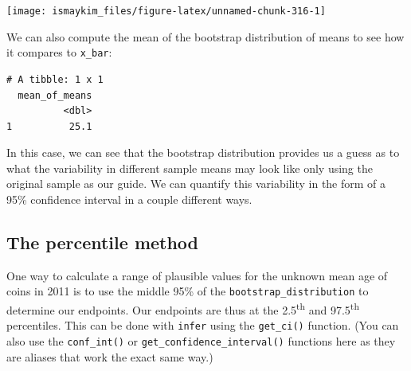 \documentclass[12pt,]{krantz}
\makeatletter
\newenvironment{Shaded}{\begin{snugshade}}{\end{snugshade}}
\newcommand{\KeywordTok}[1]{\textcolor[rgb]{0.27,0.27,0.27}{\textbf{#1}}}
\newcommand{\DataTypeTok}[1]{\textcolor[rgb]{0.27,0.27,0.27}{#1}}
\newcommand{\FloatTok}[1]{\textcolor[rgb]{0.06,0.06,0.06}{#1}}
\newcommand{\StringTok}[1]{\textcolor[rgb]{0.5,0.5,0.5}{#1}}
\newcommand{\OperatorTok}[1]{\textcolor[rgb]{0.43,0.43,0.43}{\textbf{#1}}}
\newcommand{\NormalTok}[1]{#1}
\newenvironment{kframe}{%
\medskip{}
\setlength{\fboxsep}{.8em}
 \def\at@end@of@kframe{}%
 \ifinner\ifhmode%
  \def\at@end@of@kframe{\end{minipage}}%
  \begin{minipage}{\columnwidth}%
 \fi\fi%
 \def\FrameCommand##1{\hskip\@totalleftmargin \hskip-\fboxsep
 \colorbox{shadecolor}{##1}\hskip-\fboxsep
     \hskip-\linewidth \hskip-\@totalleftmargin \hskip\columnwidth}%
 \MakeFramed {\advance\hsize-\width
   \@totalleftmargin\z@ \linewidth\hsize
   \@setminipage}}%
 {\par\unskip\endMakeFramed%
 \at@end@of@kframe}
\renewenvironment{Shaded}{\begin{kframe}}{\end{kframe}}
\theoremstyle{definition}
\theoremstyle{definition}
\theoremstyle{definition}
\theoremstyle{remark}
\makeatother
\begin{document}
\begin{Shaded}
\end{Shaded}

\begin{center}\texttt{[image: ismaykim\_files/figure-latex/unnamed-chunk-316-1]} \end{center}

We can also compute the mean of the bootstrap distribution of means to
see how it compares to \texttt{x\_bar}:

\begin{Shaded}
\end{Shaded}

\begin{verbatim}
# A tibble: 1 x 1
  mean_of_means
          <dbl>
1          25.1
\end{verbatim}

In this case, we can see that the bootstrap distribution provides us a
guess as to what the variability in different sample means may look like
only using the original sample as our guide. We can quantify this
variability in the form of a 95\% confidence interval in a couple
different ways.

\subsection{The percentile method}\label{percentile-method}

One way to calculate a range of plausible values for the unknown mean
age of coins in 2011 is to use the middle 95\% of the
\texttt{bootstrap\_distribution} to determine our endpoints. Our
endpoints are thus at the 2.5\textsuperscript{th} and
97.5\textsuperscript{th} percentiles. This can be done with
\texttt{infer} using the \texttt{get\_ci()} function. (You can also use
the \texttt{conf\_int()} or \texttt{get\_confidence\_interval()}
functions here as they are aliases that work the exact same way.)

\begin{Shaded}
\end{Shaded}
\end{document}
